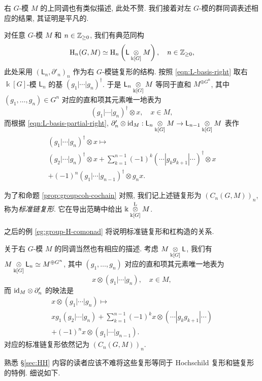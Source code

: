右 $G$-模 $M$ 的上同调也有类似描述, 此处不赘. 我们接着对左 $G$-模的群同调表述相应的结果, 其证明是平凡的.

\begin{proposition}[以标准链复形计算群同调]\label{prop:grouph-chain}
	对任意 $G$-模 $M$ 和 $n \in \Z_{\geq 0}$, 我们有典范同构
	\[ \Hm_n(G, M) \simeq \Hm_n\left( \mathsf{L} \dotimes{\Bbbk[G]} M\right), \quad n \in \Z_{\geq 0}, \]
	此处采用 $(\mathsf{L}_n, \partial'_n)_n$ 作为右 $G$-模链复形的结构. 按照 \eqref{eqn:L-basis-right} 取右 $\Bbbk[G]$-模 $\mathsf{L}_n$ 的基 $(g_1 | \cdots | g_n)^\dagger$. 于是 $\mathsf{L}_n \dotimes{\Bbbk[G]} M$ 等同于直和 $M^{\oplus G^n}$, 其中 $(g_1, \ldots, g_n) \in G^n$ 对应的直和项其元素唯一地表为
	\[ (g_1 | \cdots | g_n)^\dagger \otimes x, \quad x \in M, \]
	而根据 \eqref{eqn:L-basis-partial-right}, $\partial'_n \otimes \identity_M: \mathsf{L}_n \dotimes{\Bbbk[G]} M \to \mathsf{L}_{n-1} \dotimes{\Bbbk[G]} M$ 表作
	\begin{multline*}
		(g_1 | \cdots | g_n)^\dagger \otimes x \mapsto \\
		(g_2 | \cdots | g_n)^\dagger \otimes x + \sum_{k=1}^{n-1} (-1)^k (\cdots | g_k g_{k+1} | \cdots)^\dagger \otimes x \\
		+ (-1)^n (g_1 | \cdots | g_{n-1})^\dagger \otimes g_n x.
	\end{multline*}

	为了和命题 \ref{prop:groupcoh-cochain} 对照, 我们记上述链复形为 $(C_n(G, M))_n$, 称为\emph{标准链复形}. 它在导出范畴中给出 $\Bbbk \otimesL[{\Bbbk[G]}] M$.
\end{proposition}

之后的例 \ref{eg:group-H-comonad} 将说明标准链复形和杠构造的关系.

关于右 $G$-模 $M$ 的同调当然也有相应的描述. 考虑 $M \dotimes{\Bbbk[G]} \mathsf{L}$, 我们有 $M \dotimes{\Bbbk[G]} \mathsf{L}_n \simeq M^{\oplus G^n}$, 其中 $(g_1, \ldots, g_n)$ 对应的直和项其元素唯一地表为
\[ x \otimes (g_1 | \cdots | g_n), \quad x \in M, \]
而 $\identity_M \otimes \partial'_n$ 的映法是
\begin{multline*}
	x \otimes (g_1 | \cdots | g_n) \mapsto \\
	x g_1 (g_2 | \cdots | g_n) + \sum_{k=1}^{n-1} (-1)^k x \otimes (\cdots | g_k g_{k+1} | \cdots) \\
	+ (-1)^n x \otimes (g_1 | \cdots | g_{n-1}).
\end{multline*}
对应的标准链复形依然记为 $(C_n(G, M))_n$.

熟悉 \S\ref{sec:HH} 内容的读者应该不难将这些复形等同于 Hochschild 复形和链复形的特例. 细说如下.

